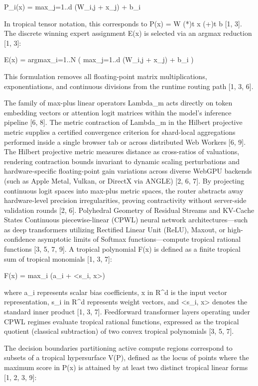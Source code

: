 P_i(x) = max_{j=1..d} (W_{i,j} + x_j) + b_i


In tropical tensor notation, this corresponds to P(x) = W (*)t x (+)t b [1, 3]. The discrete winning expert assignment E(x) is selected via an argmax reduction [1, 3]:


E(x) = argmax_{i=1..N} ( max_{j=1..d} (W_{i,j} + x_j) + b_i )


This formulation removes all floating-point matrix multiplications, exponentiations, and continuous divisions from the runtime routing path [1, 3, 6].


The family of max-plus linear operators Lambda_m acts directly on token embedding vectors or attention logit matrices within the model's inference pipeline [6, 8]. The metric contraction of Lambda_m in the Hilbert projective metric supplies a certified convergence criterion for shard-local aggregations performed inside a single browser tab or across distributed Web Workers [6, 9]. The Hilbert projective metric measures distance as cross-ratios of valuations, rendering contraction bounds invariant to dynamic scaling perturbations and hardware-specific floating-point gain variations across diverse WebGPU backends (such as Apple Metal, Vulkan, or DirectX via ANGLE) [2, 6, 7]. By projecting continuous logit spaces into max-plus metric spaces, the router abstracts away hardware-level precision irregularities, proving contractivity without server-side validation rounds [2, 6].
Polyhedral Geometry of Residual Streams and KV-Cache States
Continuous piecewise-linear (CPWL) neural network architectures—such as deep transformers utilizing Rectified Linear Unit (ReLU), Maxout, or high-confidence asymptotic limits of Softmax functions—compute tropical rational functions [3, 5, 7, 9]. A tropical polynomial F(x) is defined as a finite tropical sum of tropical monomials [1, 3, 7]:


F(x) = max_i (a_i + <s_i, x>)


where a_i represents scalar bias coefficients, x in R^d is the input vector representation, s_i in R^d represents weight vectors, and <s_i, x> denotes the standard inner product [1, 3, 7]. Feedforward transformer layers operating under CPWL regimes evaluate tropical rational functions, expressed as the tropical quotient (classical subtraction) of two convex tropical polynomials [3, 5, 7].


The decision boundaries partitioning active compute regions correspond to subsets of a tropical hypersurface V(P), defined as the locus of points where the maximum score in P(x) is attained by at least two distinct tropical linear forms [1, 2, 3, 9]:


